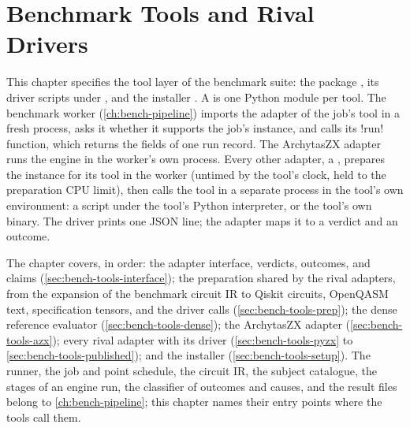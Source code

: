 \chapter{Benchmark Tools and Rival Drivers}\label{ch:bench-tools}

This chapter specifies the tool layer of the benchmark suite: the package , its driver scripts under , and the installer . A  is one Python module per tool. The benchmark worker (\cref{ch:bench-pipeline}) imports the adapter of the job's tool in a fresh process, asks it whether it supports the job's instance, and calls its \py!run! function, which returns the fields of one run record. The ArchytasZX adapter runs the engine in the worker's own process. Every other adapter, a , prepares the instance for its tool in the worker (untimed by the tool's clock, held to the preparation CPU limit), then calls the tool in a separate process in the tool's own environment: a  script under the tool's Python interpreter, or the tool's own binary. The driver prints one JSON line; the adapter maps it to a verdict and an outcome.

The chapter covers, in order: the adapter interface, verdicts, outcomes, and claims (\cref{sec:bench-tools-interface}); the preparation shared by the rival adapters, from the expansion of the benchmark circuit IR to Qiskit circuits, OpenQASM text, specification tensors, and the driver calls (\cref{sec:bench-tools-prep}); the dense reference evaluator (\cref{sec:bench-tools-dense}); the ArchytasZX adapter (\cref{sec:bench-tools-azx}); every rival adapter with its driver (\cref{sec:bench-tools-pyzx} to \cref{sec:bench-tools-published}); and the installer (\cref{sec:bench-tools-setup}). The runner, the job and point schedule, the circuit IR, the subject catalogue, the stages of an engine run, the classifier of outcomes and causes, and the result files belong to \cref{ch:bench-pipeline}; this chapter names their entry points where the tools call them.

